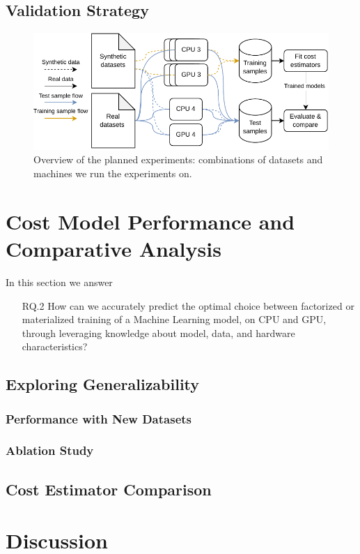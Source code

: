 \subsection{Validation Strategy}
\label{subsec:6-validation-strategy}

\begin{figure}[ht]
  \centering
  \includegraphics[width=0.8\linewidth]{chapters/06_evaluation/figures/experiment-pipeline.pdf}
  \caption{ Overview of the planned experiments: combinations of datasets and machines we run the experiments
    on. }
  \label{fig:enter-label}
\end{figure}



\section{Cost Model Performance and Comparative Analysis}
\label{sec:eval-model-evaluation}

In this section we answer
\begin{itemize}
  \item[RQ.2] How can we accurately predict the optimal choice between factorized or materialized training of a Machine Learning model, on CPU and GPU, through leveraging knowledge about model, data, and hardware characteristics?
\end{itemize}

\subsection{Exploring Generalizability}
\subsubsection{Performance with New Datasets}

\subsubsection{Ablation Study}


\subsection{Cost Estimator Comparison}


\section{Discussion}
\label{sec:eval-discussion}

